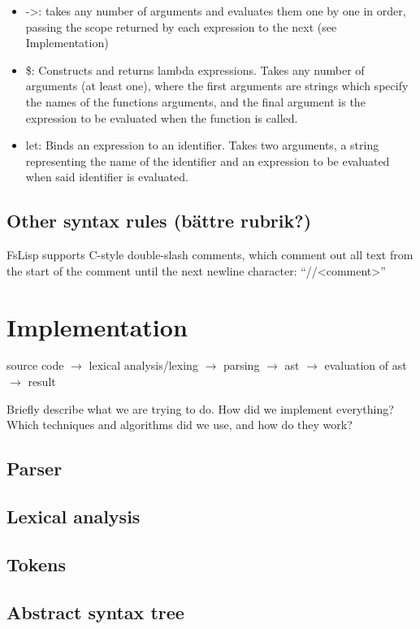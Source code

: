 \documentclass[11pt]{article}
\begin{document}
\begin{itemize}
            \item -\textgreater: takes any number of arguments and evaluates them one by one in order, passing the scope returned by each expression to the next (see Implementation)
            \item \$: Constructs and returns lambda expressions. Takes any number of arguments (at least one), where the first arguments are strings which specify the names of the functions arguments, and the final argument is the expression to be evaluated when the function is called.
            \item let: Binds an expression to an identifier. Takes two arguments, a string representing the name of the identifier and an expression to be evaluated when said identifier is evaluated.
        \end{itemize}

    \subsection{Other syntax rules (bättre rubrik?)}
        FsLisp supports C-style double-slash comments, which comment out all text from the start of the comment until the next newline character: “//\textless comment\textgreater”


\section{Implementation}
	source code $\rightarrow$ lexical analysis/lexing $\rightarrow$ parsing $\rightarrow$ ast $\rightarrow$ evaluation of ast $\rightarrow$ result

Briefly describe what we are trying to do. How did we implement everything? Which techniques and algorithms did we use, and how do they work?

\subsection{Parser}

	\subsection{Lexical analysis}
	\subsection{Tokens}
	\subsection{Abstract syntax tree}
\end{document}
